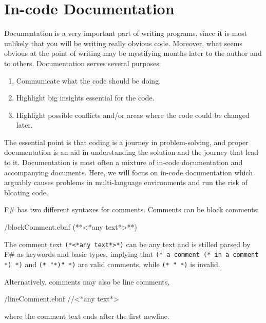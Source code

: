 \documentclass[fsharpnotes.tex]{subfiles}
\begin{document}
\chapter{In-code Documentation}
\label{chap:documentation}
Documentation is a very important part of writing programs, since it is most unlikely that you will be writing really obvious code. Moreover, what seems obvious at the point of writing may be mystifying months later to the author and to others. Documentation serves several purposes:
\begin{enumerate}
\item Communicate what the code should be doing.
\item Highlight big insights essential for the code.
\item Highlight possible conflicts and/or areas where the code could be changed later.
\end{enumerate}
The essential point is that coding is a journey in problem-solving, and proper documentation is an aid in understanding the solution and the journey that lead to it. Documentation is most often a mixture of in-code documentation and accompanying documents. Here, we will focus on in-code documentation which arguably causes problems in multi-language environments and run the risk of bloating code.

F\# has two different syntaxes for comments. Comments can be block
comments: 
%
\begin{verbatimwrite}{\ebnf/blockComment.ebnf}
(**<*any text*>**)
\end{verbatimwrite}
%
The comment text \lstinline[language=syntax]{(*<*any text*>*)} can be any text and is stilled parsed by F\# as keywords and basic types, implying that \lstinline!(* a comment (* in a comment *) *)! and \lstinline[morecomment={[l][\color{commentsColor}]{(*}}]!(* "*)" *)! are valid comments, while \lstinline!(* " *)! is invalid.

Alternatively, comments may also be line comments,
%
\begin{verbatimwrite}{\ebnf/lineComment.ebnf}
//<*any text*>
\end{verbatimwrite}
%
where the comment text ends after the first newline.
\end{document}
